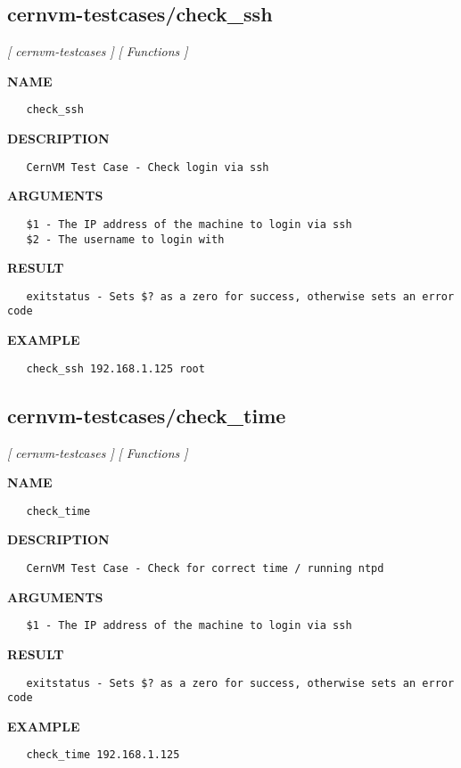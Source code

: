 \subsection{cernvm-testcases/check\_ssh}
\textsl{[ cernvm-testcases ]}
\textsl{[ Functions ]}

\label{ch:robo21}
\label{ch:cernvm_testcases_check_ssh}
\textbf{NAME}
\begin{verbatim}
   check_ssh
\end{verbatim}
\textbf{DESCRIPTION}
\begin{verbatim}
   CernVM Test Case - Check login via ssh
\end{verbatim}
\textbf{ARGUMENTS}
\begin{verbatim}
   $1 - The IP address of the machine to login via ssh
   $2 - The username to login with
\end{verbatim}
\textbf{RESULT}
\begin{verbatim}
   exitstatus - Sets $? as a zero for success, otherwise sets an error code
\end{verbatim}
\textbf{EXAMPLE}
\begin{verbatim}
   check_ssh 192.168.1.125 root
\end{verbatim}
\newpage
\subsection{cernvm-testcases/check\_time}
\textsl{[ cernvm-testcases ]}
\textsl{[ Functions ]}

\label{ch:robo22}
\label{ch:cernvm_testcases_check_time}
\textbf{NAME}
\begin{verbatim}
   check_time
\end{verbatim}
\textbf{DESCRIPTION}
\begin{verbatim}
   CernVM Test Case - Check for correct time / running ntpd
\end{verbatim}
\textbf{ARGUMENTS}
\begin{verbatim}
   $1 - The IP address of the machine to login via ssh
\end{verbatim}
\textbf{RESULT}
\begin{verbatim}
   exitstatus - Sets $? as a zero for success, otherwise sets an error code
\end{verbatim}
\textbf{EXAMPLE}
\begin{verbatim}
   check_time 192.168.1.125
\end{verbatim}
\newpage
